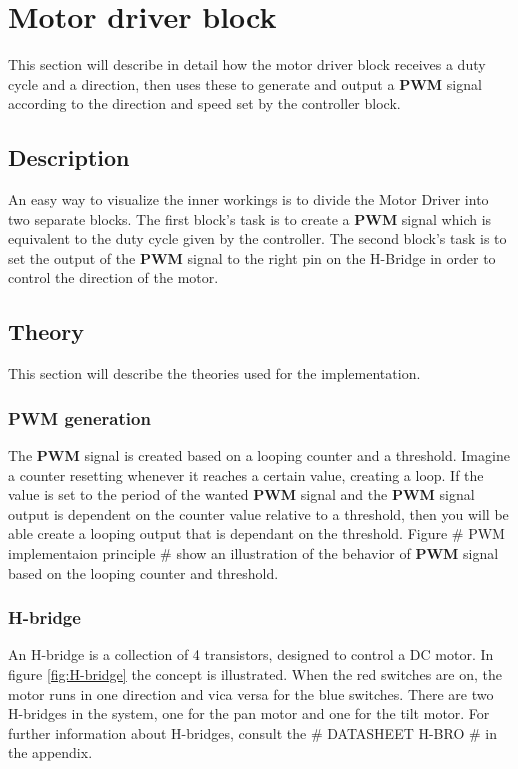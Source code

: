 \section{Motor driver block}

This section will describe in detail how the motor driver block receives a duty cycle and a direction, then uses these to generate and output a \textbf{PWM} signal according to the direction and speed set by the controller block.

\subsection{Description}

An easy way to visualize the inner workings is to divide the Motor Driver into two separate blocks. The first block’s task is to create a \textbf{PWM} signal which is equivalent to the duty cycle given by the controller. The second block’s task is to set the output of the \textbf{PWM} signal to the right pin on the H-Bridge in order to control the direction of the motor.

\subsection{Theory}

This section will describe the theories used for the implementation.

\subsubsection{PWM generation}

The \textbf{PWM} signal is created based on a looping counter and a threshold. Imagine a counter resetting whenever it reaches a certain value, creating a loop. If the value is set to the period of the wanted \textbf{PWM} signal and the \textbf{PWM} signal output is dependent on the counter value relative to a threshold, then you will be able create a looping output that is dependant on the threshold. Figure \# PWM implementaion principle \# show an illustration of the behavior of \textbf{PWM} signal based on the looping counter and threshold.

\subsubsection{H-bridge}
An H-bridge is a collection of 4 transistors, designed to control a DC motor. In figure \ref{fig:H-bridge} the concept is illustrated. When the red switches are on, the motor runs in one direction and vica versa for the blue switches. There are two H-bridges in the system, one for the pan motor and one for the tilt motor. For further information about H-bridges, consult the \# DATASHEET H-BRO \# in the appendix.


